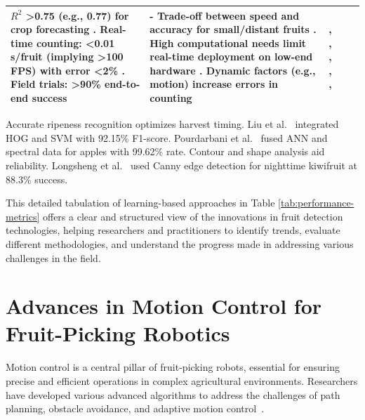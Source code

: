 \documentclass[pdflatex,sn-mathphys-num]{sn-jnl}
\begin{document}
\begin{table}[htbp]
\begin{tabular}{p{1.2cm}p{2cm}p{3cm}p{2.5cm}p{2cm}}
$R^2$ >0.75 (e.g., 0.77) for crop forecasting \cite{underwood2016mapping}. Real-time counting: <0.01 s/fruit (implying >100 FPS) with error <2\% \cite{altaheri2019date}. Field trials: >90\% end-to-end success \cite{birrell2020field} & - Trade-off between speed and accuracy for small/distant fruits \cite{kang2020real}. High computational needs limit real-time deployment on low-end hardware \cite{altaheri2019date}. Dynamic factors (e.g., motion) increase errors in counting \cite{underwood2016mapping} & \cite{underwood2016mapping}, \cite{lin2019guava}, \cite{kang2019fruit}, \cite{kang2020real}, \cite{altaheri2019date}, \cite{birrell2020field} \\ \bottomrule
\end{tabular}
\end{table}

Accurate ripeness recognition optimizes harvest timing. 
Liu et al.~\cite{liu2019mature} integrated HOG and SVM with 92.15\% F1-score. 
Pourdarbani et al.~\cite{pourdarbani2020automatic} fused ANN and spectral data for apples with 99.62\% rate.
Contour and shape analysis aid reliability. 
Longsheng et al.~\cite{longsheng2015kiwifruit} used Canny edge detection for nighttime kiwifruit at 88.3\% success.


This detailed tabulation of learning-based approaches in Table \ref{tab:performance-metrics} offers a clear and structured view of the innovations in fruit detection technologies, helping researchers and practitioners to identify trends, evaluate different methodologies, and understand the progress made in addressing various challenges in the field.

\section{Advances in Motion Control for Fruit-Picking Robotics}
Motion control is a central pillar of fruit-picking robots, essential for ensuring precise and efficient operations in complex agricultural environments. Researchers have developed various advanced algorithms to address the challenges of path planning, obstacle avoidance, and adaptive motion control~\cite{Ahmad:2023_bnb, Loganathan:2024_hho_avoa, Teo:2020, Arrouch:2022b, 10746490}.
\end{document}
